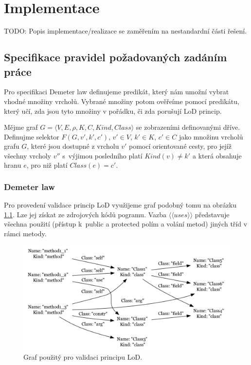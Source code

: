 \chapter{Implementace}

TODO: Popis implementace/realizace se zaměřením na nestandardní části řešení.

\section{Specifikace pravidel požadovaných zadáním práce}
Pro specifikaci Demeter law definujeme predikát, který nám umožní vybrat vhodné množiny vrcholů. Vybrané množiny potom ověřeíme pomocí predikátu, který učí, zda jsou tyto množiny v pořádku, či zda porušují LoD princip.

\begin{definition}
Mějme graf $G = \langle V, E, \rho, K, C, \mathit{Kind}, \mathit{Class}\rangle$ se zobrazeními definovanými dříve. Definujme selektor $F(G, v', k', c')$, $v' \in V$, $k' \in K$, $c' \in C$ jako množinu vrcholů grafu $G$, které jsou dostupné z vrcholu $v'$ pomocí orientované cesty, pro jejíž všechny vrcholy $v''$ s~výjimou posledního platí $Kind(v) \ne k'$ a která obsahuje hranu $e$, pro niž platí $Class(e) = c' $.
\end{definition}

\subsection{Demeter law}
Pro provedení validace princip LoD využijeme graf podobný tomu na obrázku \ref{implementation-lod_graph}. Lze jej získat ze zdrojových kódů pogramu. Vazba $\langle\langle{}uses\rangle\rangle$ představuje všechna použití (přístup k~public a protected polím a volání metod) jiných tříd v rámci metody.

\begin{figure}[h!]
  \centering
  \includegraphics[width=1.0\textwidth]{./graphs/demeter_graph.png}
  \caption{Graf použitý pro validaci principu LoD.\label{implementation-lod_graph}}
\end{figure}

